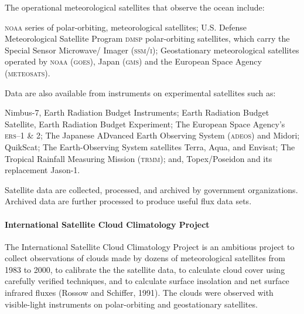 The operational meteorological satellites that observe the ocean include:
\begin{enumerate}
\vitem \textsc{noaa} series of polar-orbiting, meteorological satellites;
\vitem U.S. Defense Meteorological Satellite Program \textsc{dmsp} polar-orbiting
satellites, which carry the Special Sensor Microwave/ Imager \textsc{(ssm/i)};
\vitem Geostationary meteorological satellites operated by \textsc{noaa}
(\textsc{goes}), Japan (\textsc{gms}) and the European Space Agency
(\textsc{meteosats}).
\end{enumerate}
Data are also available from instruments on experimental satellites such
as:
\begin{enumerate}
\vitem Nimbus-7, Earth Radiation Budget Instruments;
\vitem Earth Radiation Budget Satellite, Earth Radiation Budget Experiment;
\vitem The European Space Agency's \textsc{ers}--1 \& 2;
\vitem The Japanese ADvanced Earth Observing System (\textsc{adeos}) and Midori;
\vitem QuikScat;
\vitem The Earth-Observing System satellites Terra, Aqua, and Envisat;
\vitem The Tropical Rainfall Measuring Mission (\textsc{trmm}); and,
\vitem Topex/Poseidon and its replacement Jason-1.
\end{enumerate}

Satellite data are collected, processed, and archived by government
organizations. Archived data are further processed to produce useful flux data
sets.

\paragraph{International Satellite Cloud Climatology Project}
The International Sat\-ellite Cloud Climatology Project is an ambitious
project to collect observations of clouds made by dozens of
meteorological satellites from 1983 to 2000, to calibrate the the
satellite data, to calculate cloud cover using carefully verified
techniques, and to calculate surface insolation and net
surface infrared fluxes (Rossow and Schiffer, 1991). The clouds were observed with
visible-light instruments on polar-orbiting and geostationary satellites.

